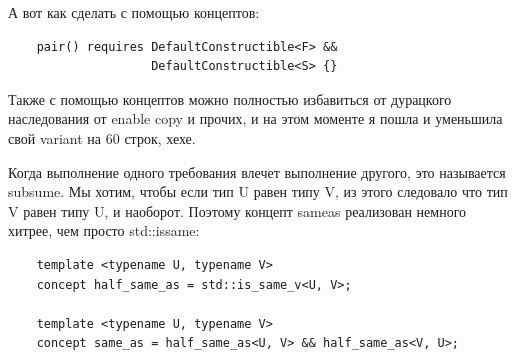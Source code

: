 \documentclass[12pt, a4paper]{article}
\begin{document}
А вот как сделать с помощью концептов:
\begin{verbatim}
	pair() requires DefaultConstructible<F> &&
					DefaultConstructible<S> {}
\end{verbatim}
Также с помощью концептов можно полностью избавиться от дурацкого наследования от enable copy и прочих, и на этом моменте я пошла и уменьшила свой variant на 60 строк, хехе.
\par Когда выполнение одного требования влечет выполнение другого, это называется subsume. Мы хотим, чтобы если тип U равен типу V, из этого следовало что тип V равен типу U, и наоборот. Поэтому концепт same\textunderscore as реализован немного хитрее, чем просто std::is\textunderscore same:
\begin{verbatim}
	template <typename U, typename V>
	concept half_same_as = std::is_same_v<U, V>;
	
	template <typename U, typename V>
	concept same_as = half_same_as<U, V> && half_same_as<V, U>;
\end{verbatim}
\end{document}
